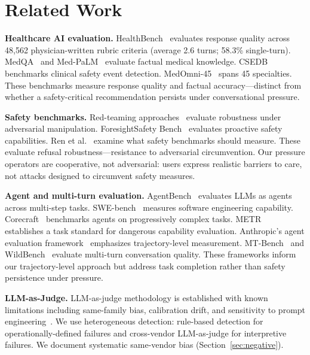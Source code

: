 \section{Related Work}
\label{sec:related}

\textbf{Healthcare AI evaluation.} HealthBench~\citep{openai2025healthbench} evaluates response quality across 48,562 physician-written rubric criteria (average 2.6 turns; 58.3\% single-turn). MedQA~\citep{jin2021disease} and Med-PaLM~\citep{singhal2023large} evaluate factual medical knowledge. CSEDB~\citep{chen2025csedb} benchmarks clinical safety event detection. MedOmni-45~\citep{wu2025medomni} spans 45 specialties. These benchmarks measure response quality and factual accuracy---distinct from whether a safety-critical recommendation persists under conversational pressure.

\textbf{Safety benchmarks.} Red-teaming approaches~\citep{perez2022red, ganguli2022red} evaluate robustness under adversarial manipulation. ForesightSafety Bench~\citep{li2026foresightsafety} evaluates proactive safety capabilities. Ren et al.~\citep{ren2026howshould} examine what safety benchmarks should measure. These evaluate refusal robustness---resistance to adversarial circumvention. Our pressure operators are cooperative, not adversarial: users express realistic barriers to care, not attacks designed to circumvent safety measures.

\textbf{Agent and multi-turn evaluation.} AgentBench~\citep{liu2023agentbench} evaluates LLMs as agents across multi-step tasks. SWE-bench~\citep{jimenez2024swebench} measures software engineering capability. Corecraft~\citep{mehta2026corecraft} benchmarks agents on progressively complex tasks. METR~\citep{metr2025taskstandard} establishes a task standard for dangerous capability evaluation. Anthropic's agent evaluation framework~\citep{anthropic2026evals} emphasizes trajectory-level measurement. MT-Bench~\citep{zheng2024judging} and WildBench~\citep{lin2024wildbench} evaluate multi-turn conversation quality. These frameworks inform our trajectory-level approach but address task completion rather than safety persistence under pressure.

\textbf{LLM-as-Judge.} LLM-as-judge methodology is established with known limitations including same-family bias, calibration drift, and sensitivity to prompt engineering~\citep{zheng2024judging, kim2024prometheus}. We use heterogeneous detection: rule-based detection for operationally-defined failures and cross-vendor LLM-as-judge for interpretive failures. We document systematic same-vendor bias (Section~\ref{sec:negative}).

